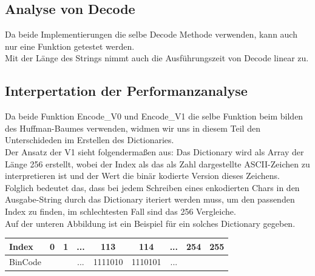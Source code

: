 \documentclass[course=erap]{aspdoc}
\begin{document}
\subsection{Analyse von Decode}

\begin{center}
\end{center}Da beide Implementierungen die selbe Decode Methode verwenden, kann auch nur eine Funktion getestet werden. \\
Mit der Länge des Strings nimmt auch die Ausführungszeit von Decode linear zu.

\subsection{Interpertation der Performanzanalyse}
Da beide Funktion Encode\_V0 und Encode\_V1 die selbe Funktion beim bilden des Huffman-Baumes verwenden, widmen wir uns in diesem Teil den Unterschideden im Erstellen des Dictionaries.\\
Der Ansatz der V1 sieht folgendermaßen aus: Das Dictionary wird als Array der Länge 256 erstellt, wobei der Index als das als Zahl dargestellte ASCII-Zeichen zu interpretieren ist und der Wert die binär kodierte Version dieses Zeichens. Folglich bedeutet das, dass bei jedem Schreiben eines enkodierten Chars in den Ausgabe-String durch das Dictionary iteriert werden muss, um den passenden Index zu finden, im schlechtesten Fall sind das 256 Vergleiche.\\ 
Auf der unteren Abbildung ist ein Beispiel für ein solches Dictionary gegeben.\\
\begin{tabular}[h]{||l|c|c|c|c|c|c|c|c||}
\hline
\rowcolor[gray]{.9}Index & 0 & 1  & ...  & 113 & 114 & ...&254 & 255 \\
\hline
BinCode&\, & \,  & ... &  1111010 &  1110101 & ... & \, & \,   \\
\hline
\end{tabular}\\\\
\end{document}

